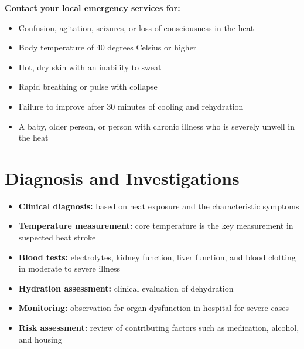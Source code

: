 \textbf{Contact your local emergency services for:}
\begin{itemize}
    \item Confusion, agitation, seizures, or loss of consciousness in the heat
    \item Body temperature of 40 degrees Celsius or higher
    \item Hot, dry skin with an inability to sweat
    \item Rapid breathing or pulse with collapse
    \item Failure to improve after 30 minutes of cooling and rehydration
    \item A baby, older person, or person with chronic illness who is severely unwell in the heat
\end{itemize}

\section*{Diagnosis and Investigations}
\begin{itemize}
    \item \textbf{Clinical diagnosis:} based on heat exposure and the characteristic symptoms
    \item \textbf{Temperature measurement:} core temperature is the key measurement in suspected heat stroke
    \item \textbf{Blood tests:} electrolytes, kidney function, liver function, and blood clotting in moderate to severe illness
    \item \textbf{Hydration assessment:} clinical evaluation of dehydration
    \item \textbf{Monitoring:} observation for organ dysfunction in hospital for severe cases
    \item \textbf{Risk assessment:} review of contributing factors such as medication, alcohol, and housing
\end{itemize}

